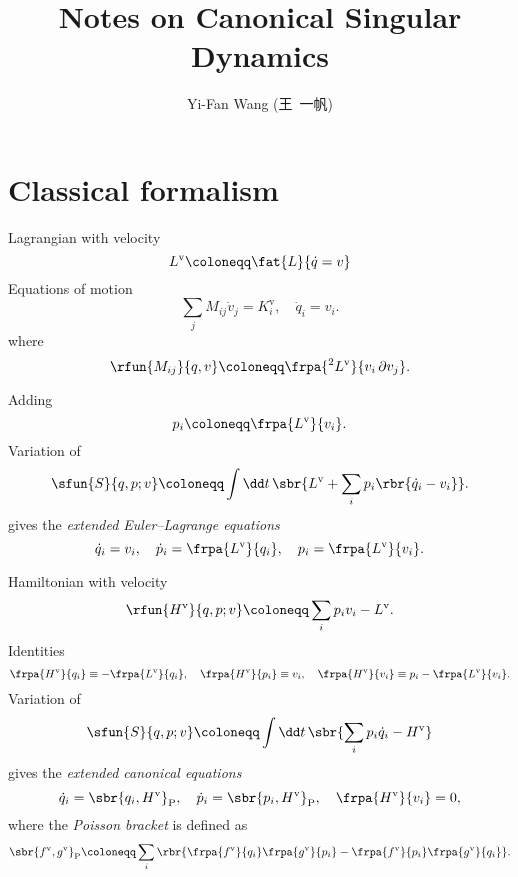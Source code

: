 \documentclass[a4paper,11pt]{article}
\title{Notes on Canonical Singular Dynamics}
\author{Yi-Fan Wang (王\ 一帆)}
\begin{document}
\maketitle

\section{Classical formalism}

Lagrangian with velocity
\begin{equation}
L^\text{v} \coloneqq \fat{L}{\dot{q} = v}
\end{equation}
Equations of motion
\begin{equation}
\sum_j M_{ij}\dot{v}_j = K^\text{v}_i,\quad
\dot{q}_i = v_i.
\end{equation}
where
\begin{equation}
\rfun{M_{ij}}{q,v} \coloneqq \frpa{^2 L^\text{v}}{v_i\,\partial v_j}.
\end{equation}

Adding
\begin{equation}
p_i \coloneqq \frpa{L^\text{v}}{v_i}.%
\end{equation}
Variation of
\begin{equation}
\sfun{S}{q, p; v} \coloneqq \int\dd t\,\sbr{L^\text{v} + \sum_i 
p_i\rbr{\dot{q}_i - v_i}}.
\end{equation}
gives the \emph{extended Euler--Lagrange equations}
\begin{equation}
\dot{q}_i = v_i,\quad
\dot{p}_i = \frpa{L^\text{v}}{q_i},\quad
p_i = \frpa{L^\text{v}}{v_i}.
\end{equation}

Hamiltonian with velocity
\begin{equation}
\rfun{H^\text{v}}{q, p; v} \coloneqq \sum_i p_i v_i - L^\text{v}.
\end{equation}
Identities
\begin{equation}
\frpa{H^\text{v}}{q_i} \equiv - \frpa{L^\text{v}}{q_i},\quad
\frpa{H^\text{v}}{p_i} \equiv v_i,\quad
\frpa{H^\text{v}}{v_i} \equiv p_i - \frpa{L^\text{v}}{v_i}.
\end{equation}
Variation of
\begin{equation}
\sfun{S}{q, p; v} \coloneqq \int\dd t\,\sbr{\sum_i 
p_i \dot{q}_i - H^\text{v}}
\end{equation}
gives the \emph{extended canonical equations}
\begin{equation}
\dot{q}_i = \sbr{q_i, H^\text{v}}_\text{P},\quad
\dot{p}_i = \sbr{p_i, H^\text{v}}_\text{P},\quad
\frpa{H^\text{v}}{v_i} = 0,
\end{equation}
where the \emph{Poisson bracket} is defined as
\begin{equation}
\sbr{f^\text{v}, g^\text{v}}_\text{P} \coloneqq 
\sum_i\rbr{\frpa{f^\text{v}}{q_i}\frpa{g^\text{v}}{p_i} -
\frpa{f^\text{v}}{p_i}\frpa{g^\text{v}}{q_i}}.
\end{equation}
\end{document}
